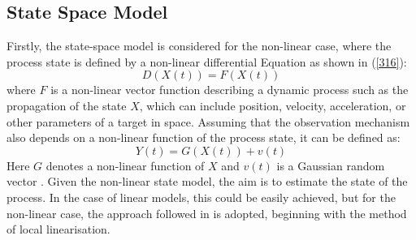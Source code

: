 \subsection{State Space Model}
Firstly, the state-space model is considered for the non-linear case, where the process state is defined by a non-linear differential Equation as shown in (\ref{316}):
\begin{equation}
    D(X(t)) = F(X(t))
    \label{316}
\end{equation}
where \(F\) is a non-linear vector function describing a dynamic process such as the propagation of the state \(X\), which can include position, velocity, acceleration, or other parameters of a target in space. Assuming that the observation mechanism also depends on a non-linear function of the process state, it can be defined as:
\begin{equation}
    Y(t) = G(X(t)) + v(t)
    \label{317}
\end{equation}
Here \(G\) denotes a non-linear function of \(X\) and \(v(t)\) is a Gaussian random vector \cite{roaldje}. Given the non-linear state model, the aim is to estimate the state of the process. In the case of linear models, this could be easily achieved, but for the non-linear case, the approach followed in \cite{Inggs1} is adopted, beginning with the method of local linearisation.

